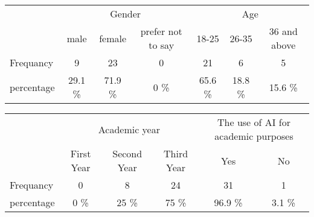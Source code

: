 \begin{table}[H]
	\begin{tabular}{l|ccc|ccc|}
		\cline{2-7}
		\multirow{2}{*}{}                & \multicolumn{3}{c|}{Gender}  & \multicolumn{3}{c|}{Age}                                                                                                                                                \\ \cline{2-7}
		                                 & \multicolumn{1}{c|}{male}    & \multicolumn{1}{c|}{female}  & \multicolumn{1}{c|}{prefer not to say} & \multicolumn{1}{c|}{18-25}   & \multicolumn{1}{c|}{26-35}   & \multicolumn{1}{c|}{36 and above} \\ \hline
		\multicolumn{1}{|l|}{Frequancy}  & \multicolumn{1}{c|}{9}       & \multicolumn{1}{c|}{23}      & \multicolumn{1}{c|}{0}                 & \multicolumn{1}{c|}{21}      & \multicolumn{1}{c|}{6}       & \multicolumn{1}{c|}{5}            \\ \hline
		\multicolumn{1}{|l|}{percentage} & \multicolumn{1}{c|}{29.1 \%} & \multicolumn{1}{c|}{71.9 \%} & \multicolumn{1}{c|}{0 \%}              & \multicolumn{1}{c|}{65.6 \%} & \multicolumn{1}{c|}{18.8 \%} & \multicolumn{1}{c|}{15.6 \%}      \\ \hline
	\end{tabular}
\end{table}
\begin{table}[H]
	\begin{tabular}{l|ccc|cc|}
		\cline{2-6}
		\multirow{2}{*}{}                & \multicolumn{3}{c|}{Academic year} & \multicolumn{2}{c|}{The use of AI for academic purposes}                                                                                                \\ \cline{2-6}
		                                 & \multicolumn{1}{c|}{First Year}    & \multicolumn{1}{c|}{Second Year}                         & \multicolumn{1}{c|}{Third Year} & \multicolumn{1}{c|}{Yes}     & \multicolumn{1}{c|}{No}     \\ \hline
		\multicolumn{1}{|l|}{Frequancy}  & \multicolumn{1}{c|}{0}             & \multicolumn{1}{c|}{8}                                   & \multicolumn{1}{c|}{24}         & \multicolumn{1}{c|}{31}      & \multicolumn{1}{c|}{1}      \\ \hline
		\multicolumn{1}{|l|}{percentage} & \multicolumn{1}{c|}{0 \%}          & \multicolumn{1}{c|}{25 \%}                               & \multicolumn{1}{c|}{75 \%}      & \multicolumn{1}{c|}{96.9 \%} & \multicolumn{1}{c|}{3.1 \%} \\ \hline
	\end{tabular}
\end{table}


